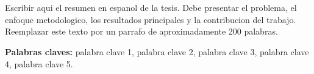 \chapter*{\runtitulo}

\noindent Escribir aqui el resumen en espanol de la tesis. Debe presentar el problema, el enfoque metodologico, los resultados principales y la contribucion del trabajo. Reemplazar este texto por un parrafo de aproximadamente 200 palabras.

\bigskip

\noindent\textbf{Palabras claves:} palabra clave 1, palabra clave 2, palabra clave 3, palabra clave 4, palabra clave 5.
